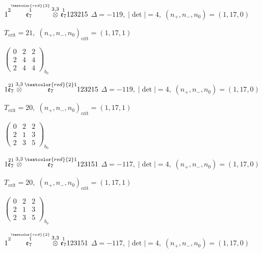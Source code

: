 \documentclass[10pt]{article}
\begin{document}
\smallskip

$1\overset{2\overset{\textcolor{red}{2}}{1}}{\mathfrak{e}_7}\overset{3,3}{\otimes}\overset{1}{\mathfrak{e}_7}123215$ \quad $\Delta=-119,\; |\det|=4,\; (n_+,n_-,n_0)=(1,17,0)$

\hspace{1em}$T_{\text{crit}}=21,\; (n_+,n_-,n_0)_{\text{crit}}=(1,17,1)$

\hspace{2em}$\left(\begin{smallmatrix}0 & 2 & 2 \\ 2 & 4 & 4 \\ 2 & 4 & 4\end{smallmatrix}\right)_{\!b_0}$

$1\overset{21}{\mathfrak{e}_7}\overset{3,3}{\otimes}\overset{\textcolor{red}{2}1}{\mathfrak{e}_7}123215$ \quad $\Delta=-119,\; |\det|=4,\; (n_+,n_-,n_0)=(1,17,0)$

\hspace{1em}$T_{\text{crit}}=20,\; (n_+,n_-,n_0)_{\text{crit}}=(1,17,1)$

\hspace{2em}$\left(\begin{smallmatrix}0 & 2 & 2 \\ 2 & 1 & 3 \\ 2 & 3 & 5\end{smallmatrix}\right)_{\!b_0}$

\smallskip

$1\overset{21}{\mathfrak{e}_7}\overset{3,3}{\otimes}\overset{\textcolor{red}{2}1}{\mathfrak{e}_7}123151$ \quad $\Delta=-117,\; |\det|=4,\; (n_+,n_-,n_0)=(1,17,0)$

\hspace{1em}$T_{\text{crit}}=20,\; (n_+,n_-,n_0)_{\text{crit}}=(1,17,1)$

\hspace{2em}$\left(\begin{smallmatrix}0 & 2 & 2 \\ 2 & 1 & 3 \\ 2 & 3 & 5\end{smallmatrix}\right)_{\!b_0}$

$1\overset{2\overset{\textcolor{red}{2}}{1}}{\mathfrak{e}_7}\overset{3,3}{\otimes}\overset{1}{\mathfrak{e}_7}123151$ \quad $\Delta=-117,\; |\det|=4,\; (n_+,n_-,n_0)=(1,17,0)$
\end{document}
